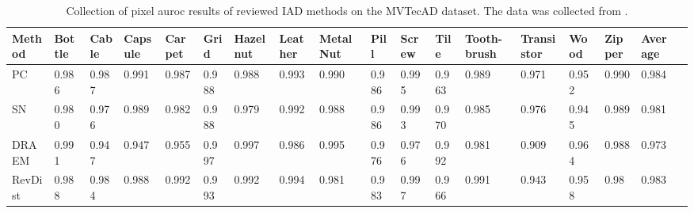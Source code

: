 \begin{table}[htbp]
    \tiny
    \centering
    \begin{tabularx}{\textwidth}{|X|X|X|X|X|X|X|X|X|X|X|X|X|X|X|X|X|X|}%
        \hline
        \textbf{Method} & \textbf{Bottle} & \textbf{Cable} & \textbf{Capsule} & \textbf{Carpet} & \textbf{Grid} & \textbf{Hazelnut} & \textbf{Leather} & \textbf{Metal Nut} & \textbf{Pill} & \textbf{Screw} & \textbf{Tile} & \textbf{Tooth-brush} & \textbf{Transistor} & \textbf{Wood} & \textbf{Zipper} & \textbf{Average} \\
        \hline
        PC \cite{patchCore2022} & 0.986 & 0.987 & 0.991 & 0.987 & 0.988 & 0.988 & 0.993 & 0.990 & 0.986 & 0.995 & 0.963 & 0.989 & 0.971 & 0.952 & 0.990 & 0.984 \\
        \hline
        SN \cite{liu2023simplenet} & 0.980 & 0.976 & 0.989 & 0.982 & 0.988 & 0.979 & 0.992 & 0.988 & 0.986 & 0.993 & 0.970 & 0.985 & 0.976 & 0.945 & 0.989 & 0.981 \\
        \hline
        DRAEM \cite{Zavrtanik_2021DRAEM} & 0.991 & 0.947 & 0.947 & 0.955 & 0.997 & 0.997 & 0.986 & 0.995 & 0.976 & 0.976 & 0.992 & 0.981 & 0.909 & 0.964 & 0.988 & 0.973 \\
        \hline
        RevDist \cite{revdist2023} & 0.988 & 0.984 & 0.988 & 0.992 & 0.993 & 0.992 & 0.994 & 0.981 & 0.983 & 0.997 & 0.966 & 0.991 & 0.943 & 0.958 & 0.98 & 0.983 \\
        \hline
    \end{tabularx}
    \caption{Collection of pixel auroc results of reviewed IAD methods on the MVTecAD \cite{MVTEC_Bergmann_2021} dataset. The data was collected from \cite{liu2024deep} \cite{liu2023simplenet} \cite{Zavrtanik_2021DRAEM} \cite{revdist2023}.}
    \label{tab:pixelaurocmvtec}
\end{table}






